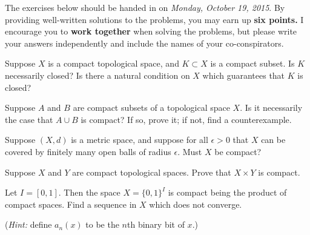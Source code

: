 \documentclass[12pt]{pset}
\author{Jim Fowler}
\date{Autumn 2015}
\begin{document}
\maketitle

\noindent The exercises below should be handed in on \textit{Monday,
  October 19, 2015}.  By providing well-written solutions to the
problems, you may earn up \textbf{six points.}  I encourage you to
\textbf{work together} when solving the problems, but please write
your answers independently and include the names of your
co-conspirators.

\begin{problem}

  Suppose $X$ is a compact topological space, and $K \subset X$ is a
  compact subset.  Is $K$ necessarily closed?  Is there a natural
  condition on $X$ which guarantees that $K$ is closed?

\end{problem}

\begin{problem}

  Suppose $A$ and $B$ are compact subsets of a topological space $X$.
  Is it necessarily the case that $A \cup B$ is compact?  If so, prove
  it; if not, find a counterexample.

\end{problem}

\begin{problem}

  Suppose $(X,d)$ is a metric space, and suppose for all
  $\epsilon > 0$ that $X$ can be covered by finitely many open balls
  of radius $\epsilon$.   Must $X$ be compact?
  
\end{problem}

\clearpage

\begin{problem}

  Suppose $X$ and $Y$ are compact topological spaces.  Prove that
  $X \times Y$ is compact.

\end{problem}

\begin{problem}

  Let $I = [0,1]$.  Then the space $X = \{0,1\}^I$ is compact being
  the product of compact spaces.  Find a sequence in $X$ which does
  not converge.

  (\textit{Hint:} define $a_n(x)$ to be the $n$th binary bit of $x$.)

\end{problem}
\end{document}
